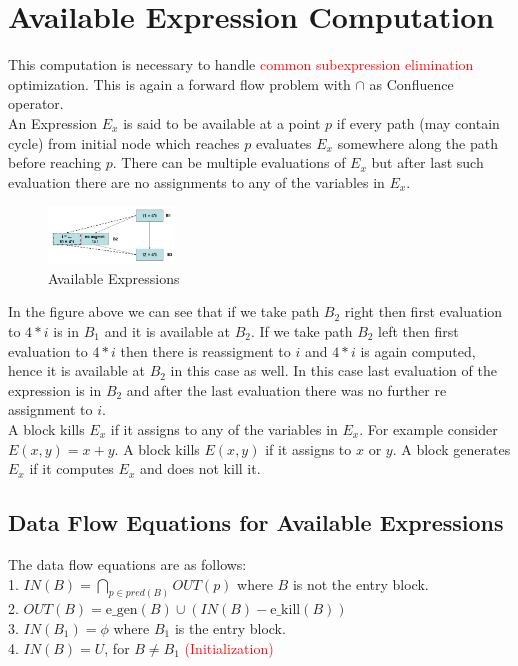 \documentclass{article}
\begin{document}
\section*{Available Expression Computation}
This computation is necessary to handle \textcolor{red}{common subexpression elimination} optimization. This is again a forward flow problem with $\cap$ as Confluence operator. \\
An Expression $E_x$ is said to be available at a point $p$ if every path (may contain cycle) from initial node which reaches $p$ evaluates $E_x$ somewhere along the path before reaching $p$. There can be multiple evaluations of $E_x$ but after last such evaluation there are no assignments to any of the variables in $E_x$. \\

\begin{figure}[h]
    \centering
    \includegraphics[width=0.3\textwidth]{Images/available1.png}
    \caption{Available Expressions}
    \label{fig:AvailableExpressions}
\end{figure}

In the figure above we can see that if we take path $B_2$ right then first evaluation to $4*i$ is in $B_1$ and it is available at $B_2$. If we take path $B_2$ left then first evaluation to $4*i$ then there is reassigment to $i$ and $4*i$ is again computed, hence it is available at $B_2$ in this case as well. In this case last evaluation of the expression is in $B_2$ and after the last evaluation there was no further re assignment to $i$.\\

A block kills $E_x$ if it assigns to any of the variables in $E_x$. For example consider $E(x,y) = x+y$. A block kills $E(x,y)$ if it assigns to $x$ or $y$. A block generates $E_x$ if it computes $E_x$ and does not kill it. \\

\subsection*{Data Flow Equations for Available Expressions}
The data flow equations are as follows: \\
1. $IN(B) = \bigcap_{p \in pred(B)} OUT(p)$ where $B$ is not the entry block. \\
2. $OUT(B) = \text{e\_gen} (B) \cup (IN(B) - \text{e\_kill}(B))$ \\
3. $IN(B_1) = \phi$ where $B_1$ is the entry block. \\
4. $IN(B) = U$, for $B \neq B_1$ \textcolor{red}{(Initialization)} \\
\end{document}
